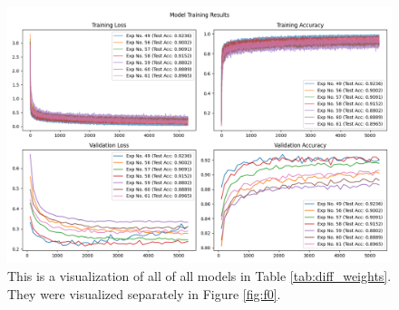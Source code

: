 \documentclass[11pt]{amsart}
\begin{document}
\begin{figure}[h]
	\centering
	\includegraphics[width=.6\textwidth]{../visualizations/model_training_results_vis_1.png}
\caption{This is a visualization of all of all models in Table \ref{tab:diff_weights}.
	They were visualized separately in Figure \ref{fig:f0}.}
    \label{fig:f1}
\end{figure}

\end{document}
